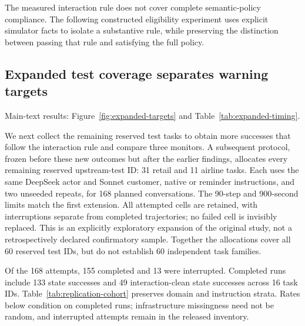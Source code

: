 The measured interaction rule does not cover complete semantic-policy compliance. The following constructed eligibility experiment uses explicit simulator facts to isolate a substantive rule, while preserving the distinction between passing that rule and satisfying the full policy.

\subsection{Expanded test coverage separates warning targets}
Main-text results: Figure~\ref{fig:expanded-targets} and Table~\ref{tab:expanded-timing}.

\label{sec:replication}
We next collect the remaining reserved test tasks to obtain more successes that follow the interaction rule and compare three monitors. A subsequent protocol, frozen before these new outcomes but after the earlier findings, allocates every remaining reserved upstream-test ID: 31 retail and 11 airline tasks. Each uses the same DeepSeek actor and Sonnet customer, native or reminder instructions, and two unseeded repeats, for 168 planned conversations. The 90-step and 900-second limits match the first extension. All attempted cells are retained, with interruptions separate from completed trajectories; no failed cell is invisibly replaced. This is an explicitly exploratory expansion of the original study, not a retrospectively declared confirmatory sample. Together the allocations cover all 60 reserved test IDs, but do not establish 60 independent task families.

Of the 168 attempts, 155 completed and 13 were interrupted. Completed runs include 133 state successes and 49 interaction-clean state successes across 16 task IDs. Table~\ref{tab:replication-cohort} preserves domain and instruction strata. Rates below condition on completed runs; infrastructure missingness need not be random, and interrupted attempts remain in the released inventory.

